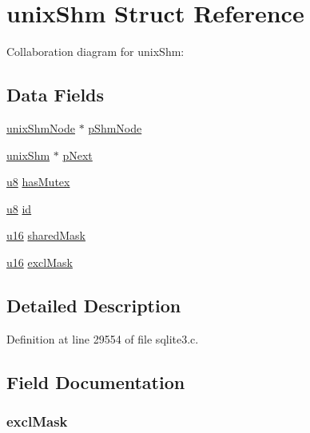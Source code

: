 \hypertarget{structunix_shm}{}\section{unix\+Shm Struct Reference}
\label{structunix_shm}


Collaboration diagram for unix\+Shm\+:
\subsection*{Data Fields}
\begin{DoxyCompactItemize}
\item 
\hyperlink{structunix_shm_node}{unix\+Shm\+Node} $\ast$ \hyperlink{structunix_shm_a33d94caf6216ac0179eaf8fc02bc0237}{p\+Shm\+Node}
\item 
\hyperlink{structunix_shm}{unix\+Shm} $\ast$ \hyperlink{structunix_shm_a601f6a37eec0aee557a466e524051505}{p\+Next}
\item 
\hyperlink{sqlite3_8c_a74a0f6424ae628af25f23f0a35f6ead3}{u8} \hyperlink{structunix_shm_a89adbea4ee456e95e800b90c9076f0aa}{has\+Mutex}
\item 
\hyperlink{sqlite3_8c_a74a0f6424ae628af25f23f0a35f6ead3}{u8} \hyperlink{structunix_shm_a06b0c1fe0b3340c9767270a44106fff3}{id}
\item 
\hyperlink{sqlite3_8c_a20f2299e322dcbde37cb07b16910b843}{u16} \hyperlink{structunix_shm_a7d537c771564d6de1ec27040e9bac2a6}{shared\+Mask}
\item 
\hyperlink{sqlite3_8c_a20f2299e322dcbde37cb07b16910b843}{u16} \hyperlink{structunix_shm_a660f4c9494cc1824968af3886eeaa982}{excl\+Mask}
\end{DoxyCompactItemize}


\subsection{Detailed Description}


Definition at line 29554 of file sqlite3.\+c.



\subsection{Field Documentation}
\hypertarget{structunix_shm_a660f4c9494cc1824968af3886eeaa982}{}
\subsubsection[{excl\+Mask}]{ excl\+Mask}\label{structunix_shm_a660f4c9494cc1824968af3886eeaa982}


